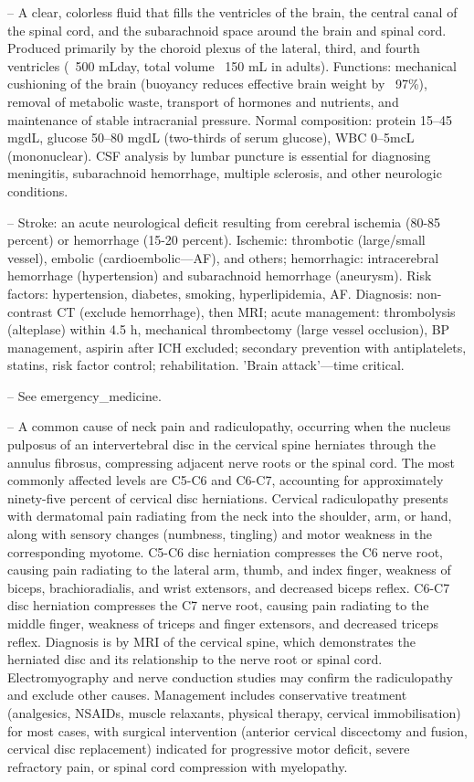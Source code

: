 -- A clear, colorless fluid that fills the ventricles of the brain, the central canal of the spinal cord, and the subarachnoid space around the brain and spinal cord. Produced primarily by the choroid plexus of the lateral, third, and fourth ventricles (~500 mL\/day, total volume ~150 mL in adults). Functions: mechanical cushioning of the brain (buoyancy reduces effective brain weight by ~97\%), removal of metabolic waste, transport of hormones and nutrients, and maintenance of stable intracranial pressure. Normal composition: protein 15--45 mg\/dL, glucose 50--80 mg\/dL (two-thirds of serum glucose), WBC 0--5\/mcL (mononuclear). CSF analysis by lumbar puncture is essential for diagnosing meningitis, subarachnoid hemorrhage, multiple sclerosis, and other neurologic conditions.

-- Stroke: an acute neurological deficit resulting from cerebral ischemia (80-85 percent) or hemorrhage (15-20 percent). Ischemic: thrombotic (large/small vessel), embolic (cardioembolic—AF), and others; hemorrhagic: intracerebral hemorrhage (hypertension) and subarachnoid hemorrhage (aneurysm). Risk factors: hypertension, diabetes, smoking, hyperlipidemia, AF. Diagnosis: non-contrast CT (exclude hemorrhage), then MRI; acute management: thrombolysis (alteplase) within 4.5 h, mechanical thrombectomy (large vessel occlusion), BP management, aspirin after ICH excluded; secondary prevention with antiplatelets, statins, risk factor control; rehabilitation. 'Brain attack'—time critical.

-- See emergency\_medicine.

-- A common cause of neck pain and radiculopathy, occurring when the nucleus pulposus of an intervertebral disc in the cervical spine herniates through the annulus fibrosus, compressing adjacent nerve roots or the spinal cord. The most commonly affected levels are C5-C6 and C6-C7, accounting for approximately ninety-five percent of cervical disc herniations. Cervical radiculopathy presents with dermatomal pain radiating from the neck into the shoulder, arm, or hand, along with sensory changes (numbness, tingling) and motor weakness in the corresponding myotome. C5-C6 disc herniation compresses the C6 nerve root, causing pain radiating to the lateral arm, thumb, and index finger, weakness of biceps, brachioradialis, and wrist extensors, and decreased biceps reflex. C6-C7 disc herniation compresses the C7 nerve root, causing pain radiating to the middle finger, weakness of triceps and finger extensors, and decreased triceps reflex. Diagnosis is by MRI of the cervical spine, which demonstrates the herniated disc and its relationship to the nerve root or spinal cord. Electromyography and nerve conduction studies may confirm the radiculopathy and exclude other causes. Management includes conservative treatment (analgesics, NSAIDs, muscle relaxants, physical therapy, cervical immobilisation) for most cases, with surgical intervention (anterior cervical discectomy and fusion, cervical disc replacement) indicated for progressive motor deficit, severe refractory pain, or spinal cord compression with myelopathy.


